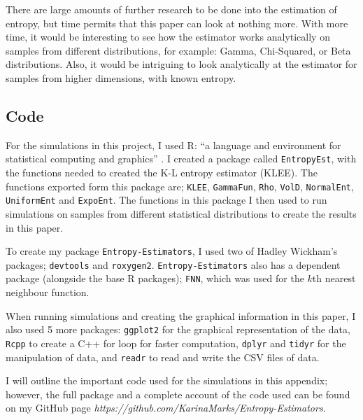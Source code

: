 \documentclass[12pt]{report}
\begin{document}
There are large amounts of further research to be done into the estimation of entropy, but time permits that this paper can look at nothing more. With more time, it would be interesting to see how the estimator works analytically on samples from different distributions, for example: Gamma, Chi-Squared, or Beta distributions. Also, it would be intriguing to look analytically at the estimator for samples from higher dimensions, with known entropy.






\begin{appendix}


\lstset{showstringspaces=false, breaklines=true}

\chapter{Code} \label{appendix_code}

For the simulations in this project, I used R: ``a language and environment for statistical computing and graphics'' \cite{code1}. I created a package called \texttt{EntropyEst}, with the functions needed to created the K-L entropy estimator (KLEE). The functions exported form this package are; \texttt{KLEE}, \texttt{GammaFun}, \texttt{Rho}, \texttt{VolD}, \texttt{NormalEnt}, \texttt{UniformEnt} and \texttt{ExpoEnt}. The functions in this package I then used to run simulations on samples from different statistical distributions to create the results in this paper.

To create my package \texttt{Entropy-Estimators}, I used two of Hadley Wickham's \cite{code2} packages; \texttt{devtools} and \texttt{roxygen2}. \texttt{Entropy-Estimators} also has a dependent package (alongside the base R packages); \texttt{FNN}, which was used for the $k$th nearest neighbour function. 

When running simulations and creating the graphical information in this paper, I also used 5 more packages: \texttt{ggplot2} for the graphical representation of the data, \texttt{Rcpp} to create a C++ for loop for faster computation, \texttt{dplyr} and \texttt{tidyr} for the manipulation of data, and \texttt{readr} to read and write the CSV files of data.

I will outline the important code used for the simulations in this appendix; however, the full package and a complete account of the code used can be found on my GitHub page \textit{https://github.com/KarinaMarks/Entropy-Estimators}.


\end{appendix}
\end{document}
